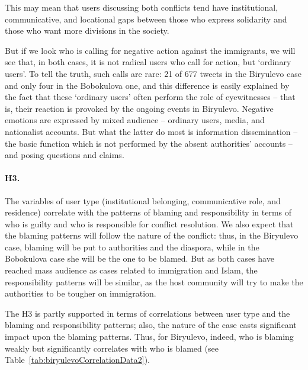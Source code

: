 This may mean that users discussing both conflicts tend have institutional, communicative, and locational gaps between those who express solidarity and those who want more divisions in the society.

But if we look who is calling for negative action against the immigrants, we will see that, in both cases, it is not radical users who call for action, but ‘ordinary users’. To tell the truth, such calls are rare: 21 of 677 tweets in the Biryulevo case and only four in the Bobokulova one, and this difference is easily explained by the fact that these ‘ordinary users’ often perform the role of eyewitnesses -- that is, their reaction is provoked by the ongoing events in Biryulevo. Negative emotions are expressed by mixed audience -- ordinary users, media, and nationalist accounts. But what the latter do most is information dissemination -- the basic function which is not performed by the absent authorities’ accounts -- and posing questions and claims.

\paragraph{H3.} The variables of user type (institutional belonging, communicative role, and residence) correlate with the patterns of blaming and responsibility in terms of who is guilty and who is responsible for conflict resolution. We also expect that the blaming patterns will follow the nature of the conflict: thus, in the Biryulevo case, blaming will be put to authorities and the diaspora, while in the Bobokulova case she will be the one to be blamed. But as both cases have reached mass audience as cases related to immigration and Islam, the responsibility patterns will be similar, as the host community will try to make the authorities to be tougher on immigration.

The H3 is partly supported in terms of correlations between user type and the blaming and responsibility patterns; also, the nature of the case casts significant impact upon the blaming patterns. Thus, for Biryulevo, indeed, who is blaming weakly but significantly correlates with who is blamed (see Table~\cref{tab:biryulevoCorrelationData2}).

